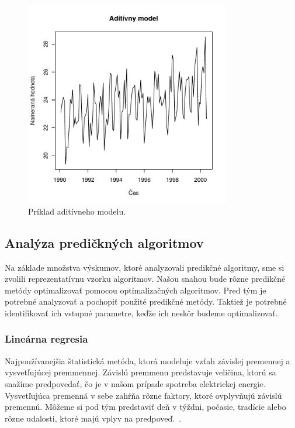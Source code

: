 \documentclass[a4paper,slovak,12pt,appendix]{article}
\begin{document}
\begin{figure}[!ht]
  \centering
  \includegraphics[width=0.8\textwidth]{add_model.pdf}
  \caption{Príklad aditívneho modelu.}
  \label{fig-add-model}
\end{figure}


\subsection{Analýza predičkných algoritmov}
Na základe množstva výskumov, ktoré analyzovali predikčné algoritmy, sme si
zvolili reprezentatívnu vzorku algoritmov. Našou snahou bude rôzne predikčné
metódy optimalizovať pomocou optimalizačných algoritmov. Pred tým je potrebné
analyzovať a pochopiť použité predikčné metódy. Taktiež je potrebné
identifikovať ich vstupné parametre, keďže ich neskôr budeme optimalizovať.


\subsubsection{Lineárna regresia}
Najpoužívanejšia štatistická metóda, ktorá modeluje vzťah závislej premennej
a vysvetľujúcej premmennej. Závislú premmenu predstavuje veličina, ktorú sa
snažíme predpovedať, čo je v našom prípade spotreba elektrickej energie.
Vysvetľujúca premenná v sebe zahŕňa rôzne faktory, ktoré ovplyvňujú závislú
premennú. Môžeme si pod tým predstaviť deň v týždni, počasie, tradície alebo rôzne
udalosti, ktoré majú vplyv na predpoveď.~\cite{KumarSingh2013, Mahalakshmi2016}.
\end{document}
